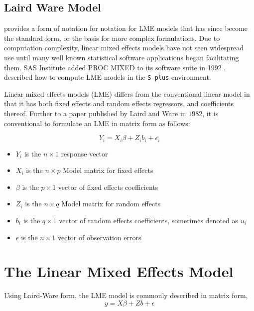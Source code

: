 \documentclass[12pt, a4paper]{report}
\theoremstyle{plain}
\theoremstyle{definition}
\theoremstyle{remark}
\begin{document}


\subsection{Laird Ware Model} 
\citet{LW82} provides a form of notation for notation for LME models that has since become the standard form, or the basis for more complex formulations. Due to computation complexity, linear mixed effects models have not seen widespread use until many well known statistical software applications began facilitating them. SAS Institute added PROC MIXED to its software suite in 1992 \citep{singer}. \citet{PB} described how to compute LME models in the \texttt{S-plus} environment.

Linear mixed effects models (LME)
differs from the conventional linear model in that it has both
fixed effects and random effects regressors, and coefficients
thereof. Further to a paper published by Laird and Ware in $1982$,
it is conventional to formulate  an LME in matrix form as follows:

\begin{displaymath}
Y_{i} =X_{i}\beta + Z_{i}b_{i} + \epsilon_{i}
\end{displaymath}
\begin{itemize}
	\item $Y_{i}$ is the $n \times 1$ response vector \item $X_{i}$ is
	the $n \times p$ Model matrix for fixed effects \item $\beta$ is
	the $p \times 1$ vector of fixed effects coefficients \item
	$Z_{i}$ is the $n \times q$ Model matrix for random effects \item
	$b_{i}$ is the $q \times 1$ vector of random effects coefficients,
	sometimes denoted as $u_{i}$ \item $\epsilon$ is the $n \times 1$
	vector of observation errors
\end{itemize}


\section{The Linear Mixed Effects Model}

Using Laird-Ware form, the LME model is commonly described in matrix form,
\begin{equation}
y = X\beta + Zb + \epsilon
\label{LW}
\end{equation}
\end{document}
